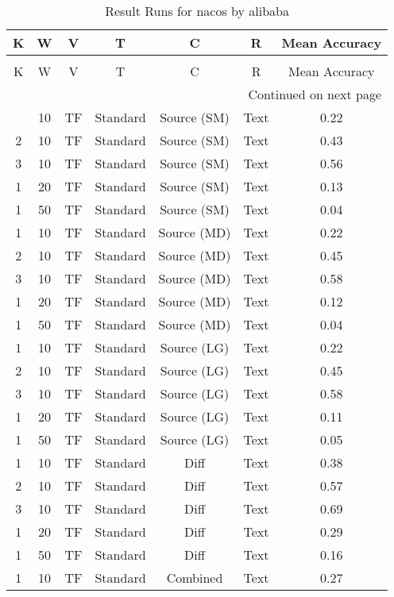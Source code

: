\begin{longtable}{|c|c|c|c|c|c|c|}
\hline
K & W & V & T & C & R & Mean Accuracy \\
\hline
\endfirsthead
\caption[]{Continued from previous page} \\
\hline
K & W & V & T & C & R & Mean Accuracy \\
\hline
\endhead
\hline
\multicolumn{7}{r}{Continued on next page} \\
\endfoot
\hline
\caption{Result Runs for nacos by alibaba} 
\label{result-runs-nacos-alibaba}
\endlastfoot
1 & 10 & TF & Standard & Source (SM) & Text & 0.22 \\
\hline
2 & 10 & TF & Standard & Source (SM) & Text & 0.43 \\
\hline
3 & 10 & TF & Standard & Source (SM) & Text & 0.56 \\
\hline
1 & 20 & TF & Standard & Source (SM) & Text & 0.13 \\
\hline
1 & 50 & TF & Standard & Source (SM) & Text & 0.04 \\
\hline
1 & 10 & TF & Standard & Source (MD) & Text & 0.22 \\
\hline
2 & 10 & TF & Standard & Source (MD) & Text & 0.45 \\
\hline
3 & 10 & TF & Standard & Source (MD) & Text & 0.58 \\
\hline
1 & 20 & TF & Standard & Source (MD) & Text & 0.12 \\
\hline
1 & 50 & TF & Standard & Source (MD) & Text & 0.04 \\
\hline
1 & 10 & TF & Standard & Source (LG) & Text & 0.22 \\
\hline
2 & 10 & TF & Standard & Source (LG) & Text & 0.45 \\
\hline
3 & 10 & TF & Standard & Source (LG) & Text & 0.58 \\
\hline
1 & 20 & TF & Standard & Source (LG) & Text & 0.11 \\
\hline
1 & 50 & TF & Standard & Source (LG) & Text & 0.05 \\
\hline
1 & 10 & TF & Standard & Diff & Text & 0.38 \\
\hline
2 & 10 & TF & Standard & Diff & Text & 0.57 \\
\hline
3 & 10 & TF & Standard & Diff & Text & 0.69 \\
\hline
1 & 20 & TF & Standard & Diff & Text & 0.29 \\
\hline
1 & 50 & TF & Standard & Diff & Text & 0.16 \\
\hline
1 & 10 & TF & Standard & Combined & Text & 0.27 \\

\end{longtable}
